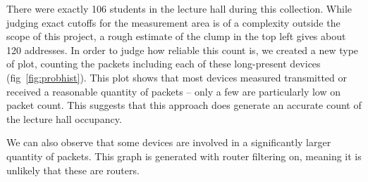There were exactly 106 students in the lecture hall during this collection.
While judging exact cutoffs for the measurement area is of a complexity outside the scope of this project, a rough estimate of the clump in the top left gives about 120 addresses.
In order to judge how reliable this count is, we created a new type of plot, counting the packets including each of these long-present devices (fig~\ref{fig:probhist}).
This plot shows that most devices measured transmitted or received a reasonable quantity of packets -- only a few are particularly low on packet count.
This suggests that this approach does generate an accurate count of the lecture hall occupancy.

We can also observe that some devices are involved in a significantly larger quantity of packets.
This graph is generated with router filtering on, meaning it is unlikely that these are routers.
